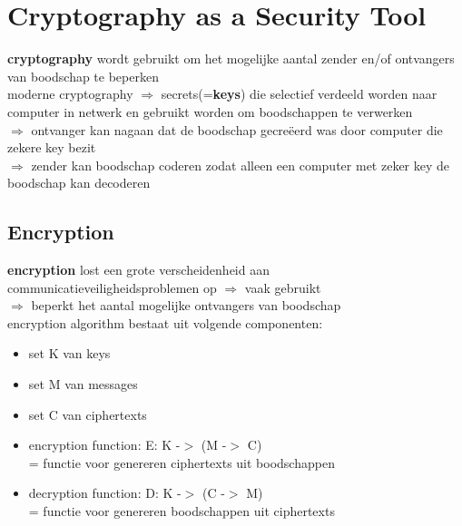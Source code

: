 \documentclass{report}
\begin{document}
\section{Cryptography as a Security Tool}
\textbf{cryptography} wordt gebruikt om het mogelijke aantal zender en/of ontvangers van boodschap te beperken
\\moderne cryptography $\Rightarrow$ secrets(=\textbf{keys}) die selectief verdeeld worden naar computer in netwerk en gebruikt worden om boodschappen te verwerken
\\$\Rightarrow$ ontvanger kan nagaan dat de boodschap gecre\"eerd was door computer die zekere key bezit
\\$\Rightarrow$ zender kan boodschap coderen zodat alleen een computer met zeker key de boodschap kan decoderen

\subsection{Encryption}
\textbf{encryption} lost een grote verscheidenheid aan communicatieveiligheidsproblemen op $\Rightarrow$ vaak gebruikt
\\$\Rightarrow$ beperkt het aantal mogelijke ontvangers van boodschap
\\encryption algorithm bestaat uit volgende componenten:
\begin{itemize}
\item set K van keys
\item set M van messages
\item set C van ciphertexts
\item encryption function: E: K -$>$ (M -$>$ C)
\\= functie voor genereren ciphertexts uit boodschappen
\item decryption function: D: K -$>$ (C -$>$ M)
\\= functie voor genereren boodschappen uit ciphertexts
\end{itemize}
\end{document}
